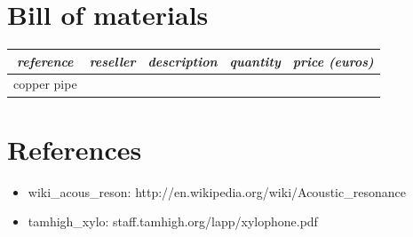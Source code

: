 \documentclass[12pt]{article}
\begin{document}
\newpage
\section{Bill of materials}
\begin{center}
  \begin{tabular}{|c|c|c|c|c|}
    \hline
    \textit{reference} &
    \textit{reseller} &
    \textit{description} &
    \textit{quantity} &
    \textit{price (euros)}\\
    \hline
    copper pipe\\
    \hline
  \end{tabular}
\end{center}

\newpage
\section{References}
\begin{itemize}
\item wiki\_acous\_reson: http://en.wikipedia.org/wiki/Acoustic\_resonance
\item tamhigh\_xylo: staff.tamhigh.org/lapp/xylophone.pdf
\end{itemize}
\end{document}
